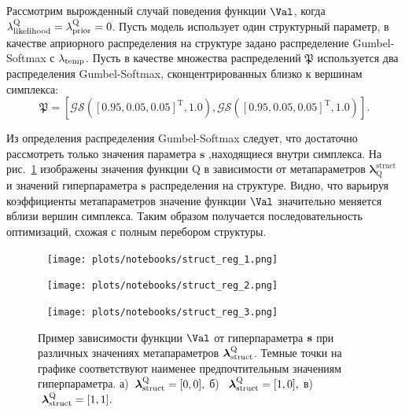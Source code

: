 \begin{example} 
Рассмотрим вырожденный случай поведения функции $\Val$, когда $\lambda_\text{likelihood}^\text{Q} = \lambda_\text{prior}^\text{Q} = 0$. Пусть модель использует один структурный параметр, в качестве априорного распределения на структуре задано распределение Gumbel-Softmax с $\lambda_{\text{temp}}$. Пусть в качестве множества распределений $\mathfrak{P}$ используется два распределения Gumbel-Softmax, сконцентрированных близко к вершинам симплекса:
\[
    \mathfrak{P} = [\mathcal{GS}([0.95, 0.05, 0.05]^\text{T}, 1.0) ,\mathcal{GS}([0.95, 0.05, 0.05]^{\text{T}}, 1.0)].
\]

Из определения распределения Gumbel-Softmax следует, что достаточно рассмотреть только значения параметра $\mathbf{s}$ ,находящиеся внутри симплекса.
На рис.~\ref{fig:gs_comb} изображены значения функции Q в зависимости от метапараметров $\boldsymbol{\lambda}^\text{struct}_\text{Q}$ и значений гиперпараметра $\mathbf{s}$ распределения на структуре. Видно, что варьируя  коэффициенты метапараметров значение функции $\Val$ значительно меняется вблизи вершин симплекса. Таким образом получается последовательность оптимизаций, схожая с полным перебором структуры.
\end{example}


\begin{figure}
 \begin{minipage}[t]{.32\textwidth}
   \texttt{[image: plots/notebooks/struct\_reg\_1.png]}
\subcaption{}
\end{minipage}
\hfill
 \begin{minipage}[t]{.32\textwidth}
   \texttt{[image: plots/notebooks/struct\_reg\_2.png]}
\subcaption{}
\end{minipage}
\hfill
 \begin{minipage}[t]{.32\textwidth}
   \texttt{[image: plots/notebooks/struct\_reg\_3.png]}
\subcaption{}
\end{minipage}

\caption{Пример зависимости функции $\Val$ от гиперпараметра $\mathbf{s}$ при различных значениях метапараметров $\boldsymbol{\lambda}_\text{struct}^\text{Q}$. Темные точки на графике соответствуют наименее предпочтительным значениям гиперпараметра. а)~$\boldsymbol{\lambda}_\text{struct}^\text{Q} = [0,0],$ б)~$~\boldsymbol{\lambda}_\text{struct}^\text{Q} = [1,0],$ в)~$~\boldsymbol{\lambda}_\text{struct}^\text{Q} = [1,1].$}
\label{fig:gs_comb}

\end{figure}

